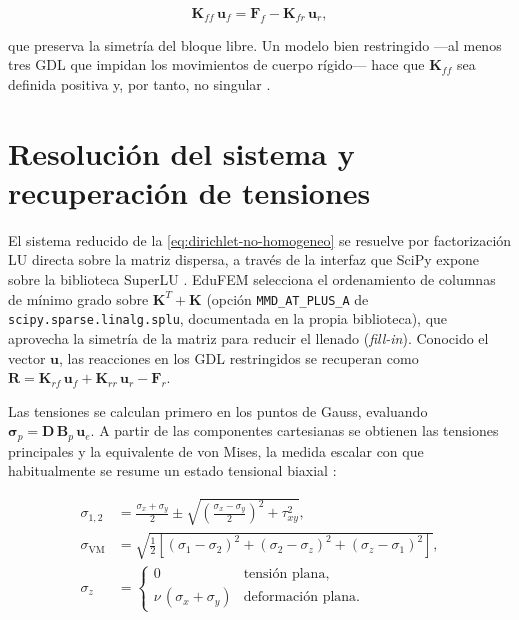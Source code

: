 \begin{equation}
\bm{K}_{ff}\,\bm{u}_f = \bm{F}_f - \bm{K}_{fr}\,\bm{u}_r,
\label{eq:dirichlet-no-homogeneo}
\end{equation}

que preserva la simetría del bloque libre. Un modelo bien restringido —al menos tres GDL que impidan los movimientos de cuerpo rígido— hace que $\bm{K}_{ff}$ sea definida positiva y, por tanto, no singular \autocite[pp.~726-727]{bathe2014fem}.

\section{Resolución del sistema y recuperación de tensiones}
\label{sec:resolucion-tensiones}

El sistema reducido de la \autoref{eq:dirichlet-no-homogeneo} se resuelve por factorización LU directa sobre la matriz dispersa, a través de la interfaz que SciPy expone sobre la biblioteca SuperLU \autocite[p.~264]{virtanen2020scipy}. EduFEM selecciona el ordenamiento de columnas de mínimo grado sobre $\bm{K}^{T}+\bm{K}$ (opción \texttt{MMD\_AT\_PLUS\_A} de \texttt{scipy.sparse.linalg.splu}, documentada en la propia biblioteca), que aprovecha la simetría de la matriz para reducir el llenado (\emph{fill-in}). Conocido el vector $\bm{u}$, las reacciones en los GDL restringidos se recuperan como $\bm{R} = \bm{K}_{rf}\,\bm{u}_f + \bm{K}_{rr}\,\bm{u}_r - \bm{F}_r$.

Las tensiones se calculan primero en los puntos de Gauss, evaluando $\bm{\sigma}_p = \bm{D}\,\bm{B}_p\,\bm{u}_e$. A partir de las componentes cartesianas se obtienen las tensiones principales \autocite[pp.~12-14]{timoshenko1970elasticity} y la equivalente de von Mises, la medida escalar con que habitualmente se resume un estado tensional biaxial \autocite[p.~117]{cook2002concepts}:

\begin{equation}
\begin{aligned}
\sigma_{1,2} &= \frac{\sigma_x + \sigma_y}{2} \pm \sqrt{\left(\frac{\sigma_x - \sigma_y}{2}\right)^2 + \tau_{xy}^2}, \\
\sigma_{\mathrm{VM}} &= \sqrt{\tfrac{1}{2}\left[(\sigma_1-\sigma_2)^2 + (\sigma_2-\sigma_z)^2 + (\sigma_z-\sigma_1)^2\right]}, \\
\sigma_z &=
\begin{cases}
0 & \text{tensión plana,}\\
\nu\,(\sigma_x+\sigma_y) & \text{deformación plana.}
\end{cases}
\end{aligned}
\label{eq:principales-vm}
\end{equation}

